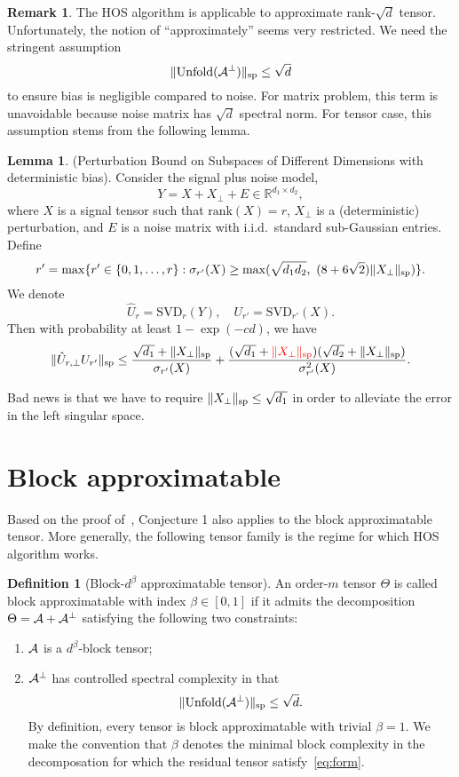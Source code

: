 \documentclass[10pt]{article}
\theoremstyle{definition}
\newtheorem{lem}{Lemma}
\theoremstyle{definition}
\newtheorem{defn}{Definition}
\newtheorem{rmk}{Remark}
\theoremstyle{definition}
\begin{document}
\begin{rmk} The HOS algorithm is applicable to approximate rank-$\sqrt{d}$ tensor. Unfortunately, the notion of ``approximately'' seems very restricted. We need the stringent assumption 
\[
\lVert\text{Unfold}(\mathcal{A}^{\perp})\rVert_\text{sp}\leq \sqrt{d}
\]
to ensure bias is negligible compared to noise. For matrix problem, this term is unavoidable because noise matrix has $\sqrt{d}$ spectral norm. For tensor case, this assumption stems from the following lemma. 
\begin{lem} (Perturbation Bound on Subspaces of Different Dimensions with deterministic bias). Consider the signal plus noise model,
\[
Y=X+X_{\perp}+E\in\mathbb{R}^{d_1\times d_2},
\]
where $X$ is a signal tensor such that $\text{rank}(X)=r$, $X_{\perp}$ is a (deterministic) perturbation, and $E$ is a noise matrix with i.i.d.\ standard sub-Gaussian entries. 
Define
\[
r'=\max\{r'\in\{0,1,\ldots,r\}: \sigma_{r'}(X)\geq \max(\sqrt{d_1d_2},\ (8+6\sqrt{2})\snormSize{}{X_{\perp}})\}.
\]
We denote 
\[
\hat U_r=\text{SVD}_r(Y), \quad U_{r'}=\text{SVD}_{r'}(X).
\]
Then with probability at least $1-\exp(-cd)$, we have
\[
\lVert\hat U_{r,\perp}U_{r'}\rVert_\text{sp}\leq {{\sqrt{d_1}+\lVert X_{\perp}\rVert_\text{sp}}\over \sigma_{r'}(X)}+ {(\sqrt{d_1}+{\color{red}\lVert X_{\perp}\rVert_\text{sp}})(\sqrt{d_2}+\lVert X_{\perp}\rVert_\text{sp}) \over \sigma^2_{r'}(X)}.
\]
\end{lem}
Bad news is that we have to require $\lVert X_{\perp}\rVert_\text{sp}\leq \sqrt{d_1}$ in order to alleviate the error in the left singular space. 


\section{Block approximatable}
Based on the proof of~\cite[Proposition 1]{han2020exact}, Conjecture 1 also applies to the block approximatable tensor. More generally, the following tensor family is the regime for which HOS algorithm works. 
\begin{defn}[Block-$d^{\beta}$ approximatable tensor] An order-$m$ tensor $\Theta$ is called block approximatable with index $\beta\in[0,1]$ if it admits the decomposition $\Theta=\mathcal{A}+\mathcal{A}^{\perp}$ satisfying the following two constraints: \hfill
\begin{enumerate}
\item $\mathcal{A}$ is a $d^{\beta}$-block tensor; 
\item $\mathcal{A}^{\perp}$ has controlled spectral complexity in that
\begin{equation}\label{eq:form}
\lVert\text{Unfold}(\mathcal{A}^{\perp})\rVert_\text{sp}\leq \sqrt{d}. 
\end{equation}
By definition, every tensor is block approximatable with trivial $\beta=1$. We make the convention that $\beta$ denotes the minimal block complexity in the decomposation for which the residual tensor satisfy~\eqref{eq:form}. 
\end{enumerate}
\end{defn}



\end{rmk}
\end{document}
